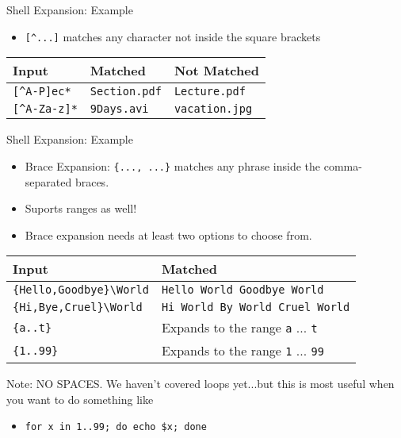 \documentclass[11pt]{beamer}
\newcommand{\colbf}[1]{\textcolor{mLightBrown!77!black}{#1}}%
\begin{document}
\begin{frame}[fragile]{Shell Expansion: Example}
  \begin{itemize}
    \item \texttt{[\^{}...]} matches any character \colbf{not} inside the square brackets
  \end{itemize}
  \begin{center}
    {\small
    \begin{tabular}{|l|l|l|}
      \hline
      Input & Matched & Not Matched\\ \hline
      \texttt{[\^{}A-P]ec*} & \texttt{Section.pdf} & \texttt{Lecture.pdf}\\ \hline
      \texttt{[\^{}A-Za-z]*} & \texttt{9Days.avi} & \texttt{vacation.jpg}\\ \hline
    \end{tabular}
    }
  \end{center}
\end{frame}

\begin{frame}[fragile]{Shell Expansion: Example}
  \begin{itemize}
    \item \colbf{Brace Expansion}: \texttt{\{..., ...\}} matches any phrase inside the comma-separated braces.
    \item Suports ranges as well!
    \item Brace expansion needs at least two options to choose from.
  \end{itemize}\vspace*{-2ex}
  \begin{center}
    {\small
    \begin{tabular}{|l|l|}
      \hline
      Input & Matched\\ \hline
      \texttt{\{Hello,Goodbye\}\textbackslash World} & \texttt{Hello World Goodbye World}\\ \hline
      \texttt{\{Hi,Bye,Cruel\}\textbackslash World} & \texttt{Hi World By World Cruel World}\\ \hline
      \texttt{\{a..t\}} & Expands to the range \texttt{a} ... \texttt{t}\\ \hline
      \texttt{\{1..99\}} & Expands to the range \texttt{1} ... \texttt{99}\\ \hline
    \end{tabular}
    }
  \end{center}
  \colbf{Note}: NO SPACES.
  We haven't covered loops yet...but this is most useful when you want to do something like
  \begin{itemize}
    \item \texttt{for x in {1..99}; do echo \$x; done}
  \end{itemize}
\end{frame}
\end{document}
